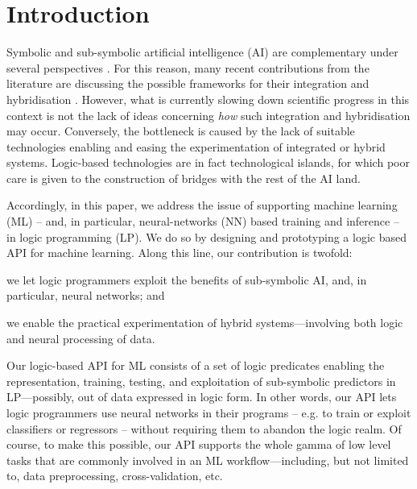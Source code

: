 \documentclass[
]{ceurart}
\begin{document}
\section{Introduction}
\label{sec:introduction}

Symbolic and sub-symbolic artificial intelligence (AI) are complementary under several perspectives \cite{ilkou2020symbolic,xaisurvey-ia14}.
%
For this reason, many recent contributions from the literature are discussing the possible frameworks for their integration and hybridisation \cite{BarredoArrieta2020,Goertzel2012,lpaas-bdcc2,xailp-woa2019}.
%
However, what is currently slowing down scientific progress in this context is not the lack of ideas concerning \emph{how} such integration and hybridisation may occur.
%
Conversely, the bottleneck is caused by the lack of suitable technologies enabling and easing the experimentation of integrated or hybrid systems.
%
Logic-based technologies are in fact technological islands, for which poor care is given to the construction of bridges with the rest of the AI land.

Accordingly, in this paper, we address the issue of supporting machine learning (ML) -- and, in particular, neural-networks (NN) based training and inference -- in logic programming (LP).
%
We do so by designing and prototyping a logic based API for machine learning.
%
Along this line, our contribution is twofold:
%
\begin{inlinelist}
    \item we let logic programmers exploit the benefits of sub-symbolic AI, and, in particular, neural networks; and
    \item we enable the practical experimentation of hybrid systems---involving both logic and neural processing of data.
\end{inlinelist}

Our logic-based API for ML consists of a set of logic predicates enabling the representation, training, testing, and exploitation of sub-symbolic predictors in LP---possibly, out of data expressed in logic form.
%
In other words, our API lets logic programmers use neural networks in their programs -- e.g. to train or exploit classifiers or regressors -- without requiring them to abandon the logic realm.
%
Of course, to make this possible, our API supports the whole gamma of low level tasks that are commonly involved in an ML workflow---including, but not limited to, data preprocessing, cross-validation, etc.
\end{document}
